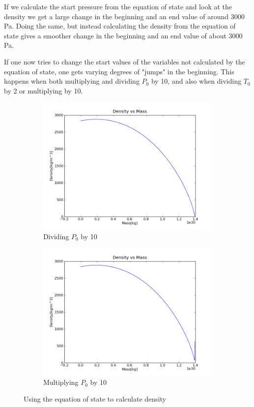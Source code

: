 \documentclass[a4paper,12pt]{article}
\begin{document}
If we calculate the start pressure from the equation of state and look at the density we get a large change in the beginning and an end value of around 3000 Pa.
Doing the same, but instead calculating the density from the equation of state gives a smoother change in the beginning and an end value of about 3000 Pa.

If one now tries to change the start values of the variables not calculated by the equation of state, one gets varying degrees of "jumps" in the beginning. This happens when both multiplying and dividing $P_0$ by 10, and also when dividing $T_0$ by 2 or multiplying by 10. 

\begin{figure}[H]
    \centering
    \begin{subfigure}{0.49\textwidth}
      \includegraphics[width=\textwidth]{Calculate_density/Density_for_rho_p_t_others_constant_Pdiv10}
      \caption{Dividing $P_0$ by 10}
      \label{fig:density_denisity_Pdiv10}
    \end{subfigure}
    \begin{subfigure}{0.49\textwidth}
      \includegraphics[width=\textwidth]{Calculate_density/Density_for_rho_p_t_others_constant_Ptimes10}
      \caption{Multiplying $P_0$ by 10}
      \label{fig:density_density_Ptimes10}
    \end{subfigure}
    \caption{Using the equation of state to calculate density}
\end{figure}
\end{document}
